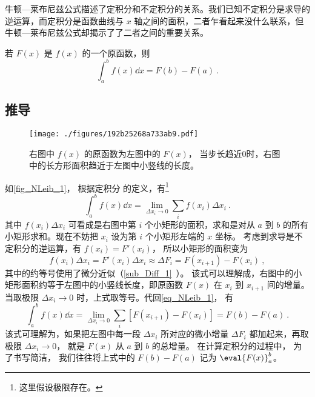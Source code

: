 

牛顿—莱布尼兹公式描述了定积分和不定积分的关系。我们已知不定积分是求导的逆运算，而定积分是函数曲线与 $x$ 轴之间的面积，二者乍看起来没什么联系，但牛顿—莱布尼兹公式却揭示了了二者之间的重要关系。

若 $F(x)$ 是 $f(x)$ 的一个原函数，则
\begin{equation}\label{eq_NLeib_1}
\int_a^b f(x) \dd{x}  = F(b) - F(a)~.
\end{equation}

\subsection{推导}
\begin{figure}[ht]
\centering
\texttt{[image: ./figures/192b25268a733ab9.pdf]}
\caption{右图中 $f(x)$ 的原函数为左图中的 $F(x)$， 当步长趋近0时，右图中的长方形面积趋近于左图中小竖线的长度。}\label{fig_NLeib_1}
\end{figure}

如\autoref{fig_NLeib_1}， 根据定积分 的定义，有\footnote{这里假设极限存在。}
\begin{equation}
\int_a^b f(x) \dd{x}= \lim_{\Delta x_i\to 0}\sum_i f(x_i)\Delta x_i~.
\end{equation}
其中 $f(x_i)\Delta x_i$ 可看成是右图中第 $i$ 个小矩形的面积，求和是对从 $a$ 到 $b$ 的所有小矩形求和。现在不妨把 $x_i$ 设为第 $i$ 个小矩形左端的 $x$ 坐标。 考虑到求导是不定积分的逆运算，有 $f(x_i)=F'(x_i)$， 所以小矩形的面积变为
\begin{equation}
f(x_i)\Delta x_i = F'(x_i)\Delta x_i \approx \Delta F_i = F(x_{i+1})-F(x_i)~,
\end{equation}
其中的约等号使用了微分近似（\autoref{sub_Diff_1}~）。 该式可以理解成，右图中的小矩形面积约等于左图中的小竖线长度，即原函数 $F(x)$ 在 $x_i$ 到 $x_{i+1}$ 间的增量。当取极限 $\Delta x_i \to 0$ 时，上式取等号。代回\autoref{eq_NLeib_1}， 有
\begin{equation}
\int_a^b f(x) \dd{x}= \lim_{\Delta x_i\to 0}\sum_i [F(x_{i+1})-F(x_i)] = F(b)-F(a)~.
\end{equation}
该式可理解为，如果把左图中每一段 $\Delta x_i$ 所对应的微小增量 $\Delta F_i$ 都加起来，再取极限 $\Delta x_i \to 0$， 就是 $F(x)$ 从 $a$ 到 $b$ 的总增量。 在计算定积分的过程中， 为了书写简洁， 我们往往将上式中的 $F(b) - F(a)$ 记为 $\eval{F(x)}_a^b$。

